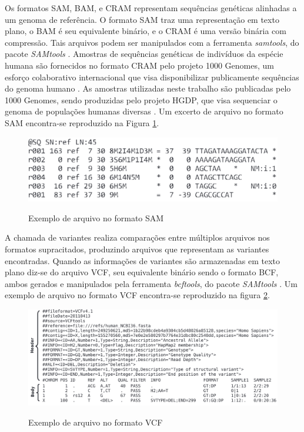 \documentclass[cic,tc]{iiufrgs}
\begin{document}
Os formatos SAM, BAM, e CRAM representam sequências genéticas alinhadas a um
genoma de referência. O formato SAM traz uma representação em texto plano, o
BAM é seu equivalente binário, e o CRAM é uma versão binária com compressão.
Tais arquivos podem ser manipulados com a ferramenta \textit{samtools}, do pacote
\textit{SAMtools} \cite{danecek2021twelve}. Amostras de sequências genéticas de
indivíduos da espécie humana são fornecidos no formato CRAM pelo projeto 1000
Genomes, um esforço colaborativo internacional que visa disponibilizar
publicamente sequências do genoma humano \cite{via20101000}. As amostras
utilizadas neste trabalho são publicadas pelo 1000 Genomes, sendo produzidas
pelo projeto HGDP, que visa sequenciar o genoma de populações humanas diversas
\cite{cavalli2005human}. Um excerto de arquivo no formato SAM encontra-se
reproduzido na Figura \ref{fig:sam}.

\begin{figure} \caption{Exemplo de arquivo no formato SAM} \begin{center}
\includegraphics[width=0.8\linewidth]{img/sam.png} \end{center}
 \label{fig:sam} \end{figure}

A chamada de variantes realiza comparações entre múltiplos arquivos nos
formatos supracitados, produzindo arquivos que representam as variantes
encontradas. Quando as informações de variantes são armazenadas em texto plano
diz-se do arquivo VCF, seu equivalente binário sendo o formato BCF, ambos
gerados e manipulados pela ferramenta \textit{bcftools}, do pacote
\textit{SAMtools} \cite{danecek2021twelve}. Um exemplo de arquivo no formato
VCF encontra-se reproduzido na figura \ref{fig:vcf}.

\begin{figure} \caption{Exemplo de arquivo no formato VCF} \begin{center}
\includegraphics[width=0.8\linewidth]{img/vcf.png} \end{center}
 \label{fig:vcf} \end{figure}
\end{document}
